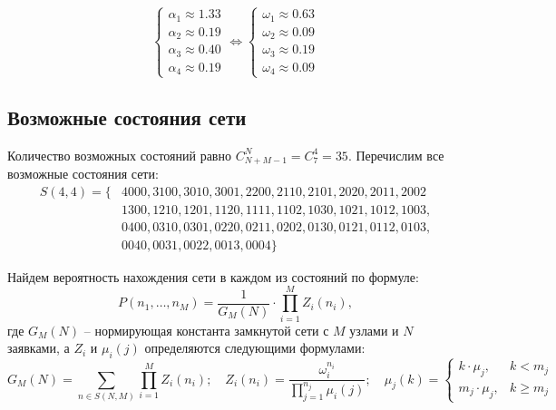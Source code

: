 \begin{displaymath}
	\begin{cases}
		\alpha_1 \approx 1.33 \\
		\alpha_2 \approx 0.19 \\
		\alpha_3 \approx 0.40 \\
		\alpha_4 \approx 0.19
	\end{cases} \Leftrightarrow \begin{cases}
		\omega_1 \approx 0.63 \\
		\omega_2 \approx 0.09 \\
		\omega_3 \approx 0.19 \\
		\omega_4 \approx 0.09
	\end{cases}
\end{displaymath}

\subsection{Возможные состояния сети}

Количество возможных состояний равно $C_{N+M-1}^{N} = C_{7}^{4} = 35$. Перечислим все возможные состояния сети:
\begin{displaymath}
	\begin{split}
	S(4, 4) = \{ 
		&4000, 3100, 3010, 3001, 2200, 2110, 2101, 2020, 2011, 2002 \\ 
		&1300, 1210, 1201, 1120, 1111, 1102, 1030, 1021, 1012, 1003, \\ 
		&0400, 0310, 0301, 0220, 0211, 0202, 0130, 0121, 0112, 0103, \\ 
		&0040, 0031, 0022, 0013, 0004 \}
	\end{split}
\end{displaymath}

Найдем вероятность нахождения сети в каждом из состояний по формуле:
\begin{displaymath}
	P(n_1, \dots, n_M) = \frac{1}{G_M(N)} \cdot \prod \limits_{i=1}^{M} Z_i(n_i),
\end{displaymath}
где $G_M(N)$ -- нормирующая константа замкнутой сети с $M$ узлами и $N$ заявками, а $Z_i$ и $\mu_i(j)$ определяются следующими формулами:
\begin{displaymath}
	G_M(N) = \sum \limits_{n \in S(N, M)} \prod \limits_{i=1}^{M} Z_i(n_i); \quad
	Z_i(n_i) = \frac{\omega_i^{n_i}}{\prod \limits_{j=1}^{n_j} \mu_i(j)}; \quad
	\mu_j(k) = \begin{cases} 
		k \cdot \mu_j, &k < m_j \\
		m_j \cdot \mu_j, &k \geq m_j 
	\end{cases}
\end{displaymath}

